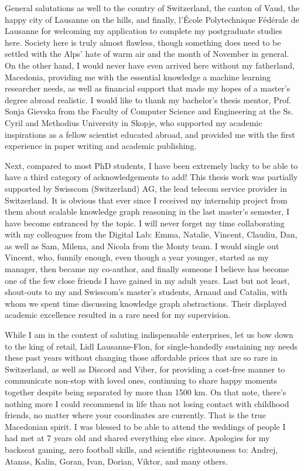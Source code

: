 General salutations as well to the country of Switzerland, the canton of Vaud, the happy city of Lausanne on the hills, and finally, l'École Polytechnique Fédérale de Lausanne for welcoming my application to complete my postgraduate studies here. Society here is truly almost flawless, though something does need to be settled with the Alps' hate of warm air and the month of November in general. On the other hand, I would never have even arrived here without my fatherland, Macedonia, providing me with the essential knowledge a machine learning researcher needs, as well as financial support that made my hopes of a master's degree abroad realistic. I would like to thank my bachelor's thesis mentor, Prof. Sonja Gievska from the Faculty of Computer Science and Engineering at the Ss. Cyril and Methodius University in Skopje, who supported my academic inspirations as a fellow scientist educated abroad, and provided me with the first experience in paper writing and academic publishing.

Next, compared to most PhD students, I have been extremely lucky to be able to have a third category of acknowledgements to add! This thesis work was partially supported by Swisscom (Switzerland) AG, the lead telecom service provider in Switzerland. It is obvious that ever since I received my internship project from them about scalable knowledge graph reasoning in the last master's semester, I have become entranced by the topic. I will never forget my time collaborating with my colleagues from the Digital Lab: Emma, Natalie, Vincent, Claudiu, Dan, as well as Sam, Milena, and Nicola from the Monty team. I would single out Vincent, who, funnily enough, even though a year younger, started as my manager, then became my co-author, and finally someone I believe has become one of the few close friends I have gained in my adult years. Last but not least, shout-outs to my and Swisscom's master's students, Arnaud and Catalin, with whom we spent time discussing knowledge graph abstractions. Their displayed academic excellence resulted in a rare need for my supervision. 

While I am in the context of saluting indispensable enterprises, let us bow down to the king of retail, Lidl Lausanne-Flon, for single-handedly sustaining my needs these past years without changing those affordable prices that are so rare in Switzerland, as well as Discord and Viber, for providing a cost-free manner to communicate non-stop with loved ones, continuing to share happy moments together despite being separated by more than 1500 km. On that note, there's nothing more I could recommend in life than not losing contact with childhood friends, no matter where your coordinates are currently. That is the true Macedonian spirit. I was blessed to be able to attend the weddings of people I had met at 7 years old and shared everything else since. Apologies for my backseat gaming, zero football skills, and scientific righteousness to: Andrej, Atanas, Kalin, Goran, Ivan, Dorian, Viktor, and many others.

